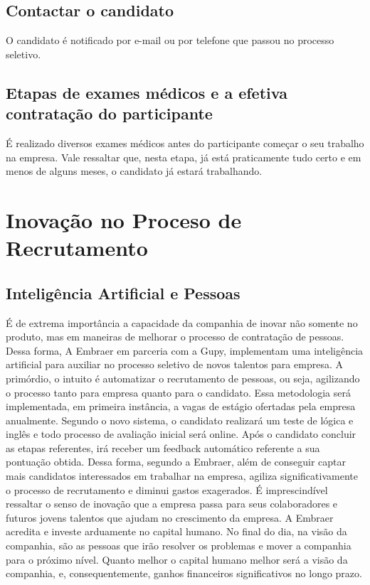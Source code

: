 \section{Contactar o candidato}
O candidato é notificado por e-mail ou por telefone que passou no processo seletivo.

\section{ Etapas de exames médicos e a efetiva contratação do participante}
É realizado diversos exames médicos antes do participante começar o seu trabalho na empresa. Vale ressaltar que, nesta etapa, já está praticamente tudo certo e em menos de alguns meses, o candidato já estará trabalhando.


\chapter{Inovação no Proceso de Recrutamento}

\section{Inteligência Artificial e Pessoas}
É de extrema importância a capacidade da companhia de inovar não somente no produto, mas em maneiras de melhorar o processo de contratação de pessoas. Dessa forma,
A Embraer em parceria com a Gupy, implementam uma inteligência artificial para auxiliar no processo seletivo de novos talentos para empresa. A primórdio, o intuito é automatizar o recrutamento de pessoas, ou seja, agilizando o processo tanto para empresa quanto para o candidato. Essa metodologia será implementada, em primeira instância, a vagas de estágio ofertadas pela empresa anualmente. Segundo o novo sistema, o candidato realizará um teste de lógica e inglês e todo processo de avaliação inicial será online. Após o candidato concluir as etapas referentes, irá receber um feedback automático referente a sua pontuação obtida. Dessa forma, segundo a Embraer, além de conseguir captar mais candidatos interessados em trabalhar na empresa, agiliza significativamente o processo de recrutamento e diminui gastos exagerados.
É imprescindível ressaltar o senso de inovação que a empresa passa para seus colaboradores e futuros jovens talentos que ajudam no crescimento da empresa. A Embraer acredita e investe arduamente no capital humano. No final do dia, na visão da companhia, são as pessoas que irão resolver os problemas e mover a companhia para o próximo nível. Quanto melhor o capital humano melhor será a visão da companhia, e, consequentemente, ganhos financeiros significativos no longo prazo.






